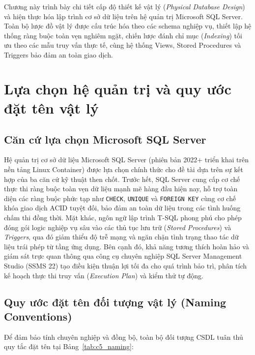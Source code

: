 
Chương này trình bày chi tiết cấp độ thiết kế vật lý (\textit{Physical Database Design}) và hiện thực hóa lập trình cơ sở dữ liệu trên hệ quản trị Microsoft SQL Server. Toàn bộ lược đồ vật lý được cấu trúc hóa theo các schema nghiệp vụ, thiết lập hệ thống ràng buộc toàn vẹn nghiêm ngặt, chiến lược đánh chỉ mục (\textit{Indexing}) tối ưu theo các mẫu truy vấn thực tế, cùng hệ thống Views, Stored Procedures và Triggers bảo đảm an toàn giao dịch.

\section{Lựa chọn hệ quản trị và quy ước đặt tên vật lý}
\label{s:c5_dbms_naming}

\subsection{Căn cứ lựa chọn Microsoft SQL Server}
Hệ quản trị cơ sở dữ liệu Microsoft SQL Server (phiên bản 2022+ triển khai trên nền tảng Linux Container) được lựa chọn chính thức cho đề tài dựa trên sự kết hợp của ba căn cứ kỹ thuật then chốt. Trước hết, SQL Server cung cấp cơ chế thực thi ràng buộc toàn vẹn dữ liệu mạnh mẽ hàng đầu hiện nay, hỗ trợ toàn diện các ràng buộc phức tạp như \texttt{CHECK}, \texttt{UNIQUE} và \texttt{FOREIGN KEY} cùng cơ chế khóa giao dịch ACID tuyệt đối, bảo đảm an toàn dữ liệu trong các tình huống chấm thi đồng thời. Mặt khác, ngôn ngữ lập trình T-SQL phong phú cho phép đóng gói logic nghiệp vụ sâu vào các thủ tục lưu trữ (\textit{Stored Procedures}) và \textit{Triggers}, qua đó giảm thiểu độ trễ mạng và ngăn chặn tình trạng thao tác dữ liệu trái phép từ tầng ứng dụng. Bên cạnh đó, khả năng tương thích hoàn hảo và giám sát trực quan thông qua công cụ chuyên nghiệp SQL Server Management Studio (SSMS 22) tạo điều kiện thuận lợi tối đa cho quá trình bảo trì, phân tích kế hoạch thực thi truy vấn (\textit{Execution Plan}) và kiểm thử tự động.

\subsection{Quy ước đặt tên đối tượng vật lý (Naming Conventions)}
Để đảm bảo tính chuyên nghiệp và đồng bộ, toàn bộ đối tượng CSDL tuân thủ quy tắc đặt tên tại Bảng~\ref{tab:c5_naming}:

